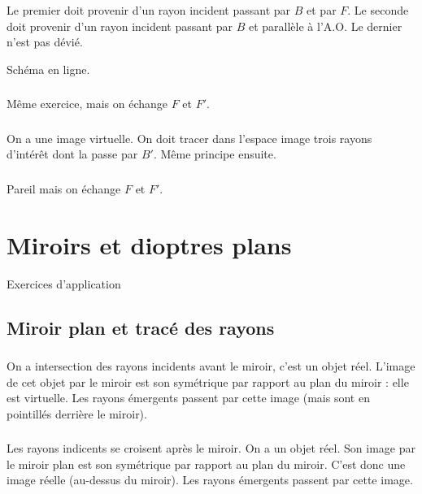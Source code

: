 \documentclass[10pt,a5paper,notitlepage]{book}
\begin{document}
Le premier doit provenir d'un rayon incident passant par $B$ et par $F$. Le
seconde doit provenir d'un rayon incident passant par $B$ et parallèle à l'A.O.
Le dernier n'est pas dévié. \bigbreak

Schéma en ligne.

\subsection{}
Même exercice, mais on échange $F$ et $F'$.

\subsection{}
On a une image virtuelle. On doit tracer dans l'espace image trois rayons
d'intérêt dont la  passe par $B'$. Même principe ensuite.

\subsection{}
Pareil mais on échange $F$ et $F'$.

\theendnotes

\chapter{Miroirs et dioptres plans}
\vspace*{-47pt}
\begin{center}
    \Huge Exercices d'application
\end{center}

\section{Miroir plan et tracé des rayons}
\subsection{}
On a intersection des rayons incidents avant le miroir, c'est un objet réel.
L'image de cet objet par le miroir est son symétrique par rapport au plan du
miroir : elle est virtuelle. Les rayons émergents passent par cette image (mais
sont en pointillés derrière le miroir).

\subsection{}
Les rayons indicents se croisent après le miroir. On a un objet réel. Son image
par le miroir plan est son symétrique par rapport au plan du miroir. C'est donc
une image réelle (au-dessus du miroir). Les rayons émergents passent par cette
image.
\end{document}
